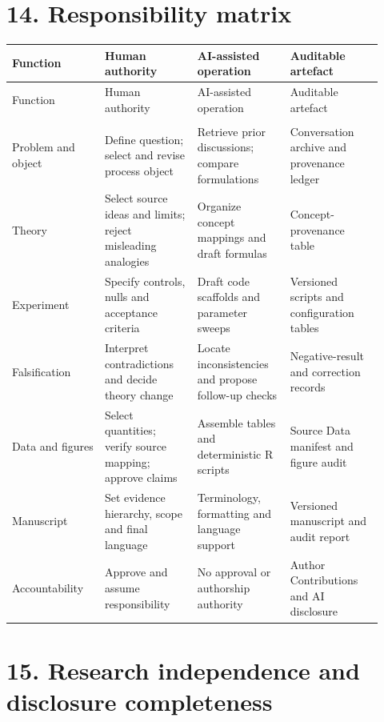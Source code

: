 \documentclass[10pt]{article}
\begin{document}
\section*{14. Responsibility matrix}

\fontsize{7}{7.8}\selectfont
\setlength{\tabcolsep}{2.5pt}
\renewcommand{\arraystretch}{1.08}
\begin{longtable}{@{}>{\RaggedRight\arraybackslash}p{0.230\linewidth}>{\RaggedRight\arraybackslash}p{0.230\linewidth}>{\RaggedRight\arraybackslash}p{0.230\linewidth}>{\RaggedRight\arraybackslash}p{0.230\linewidth}@{}}
\toprule
Function & Human authority & AI-assisted operation & Auditable artefact \\
\midrule
\endfirsthead
\toprule
Function & Human authority & AI-assisted operation & Auditable artefact \\
\midrule
\endhead
\midrule
\multicolumn{4}{r}{\footnotesize Continued on next page} \\
\endfoot
\bottomrule
\endlastfoot
Problem and object & Define question; select and revise process object & Retrieve prior discussions; compare formulations & Conversation archive and provenance ledger \\
Theory & Select source ideas and limits; reject misleading analogies & Organize concept mappings and draft formulas & Concept-provenance table \\
Experiment & Specify controls, nulls and acceptance criteria & Draft code scaffolds and parameter sweeps & Versioned scripts and configuration tables \\
Falsification & Interpret contradictions and decide theory change & Locate inconsistencies and propose follow-up checks & Negative-result and correction records \\
Data and figures & Select quantities; verify source mapping; approve claims & Assemble tables and deterministic R scripts & Source Data manifest and figure audit \\
Manuscript & Set evidence hierarchy, scope and final language & Terminology, formatting and language support & Versioned manuscript and audit report \\
Accountability & Approve and assume responsibility & No approval or authorship authority & Author Contributions and AI disclosure \\
\end{longtable}

\section*{15. Research independence and disclosure completeness}
\end{document}
